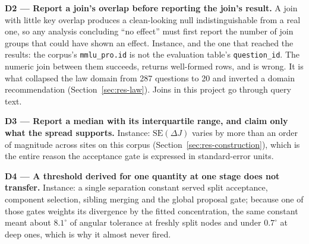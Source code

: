\textbf{D2 --- Report a join's overlap before reporting the join's
result.}
A join with little key overlap produces a clean-looking null
indistinguishable from a real one, so any analysis concluding ``no
effect'' must first report the number of join groups that could have
shown an effect.
Instance, and the one that reached the results: the corpus's
\texttt{mmlu\_pro.id} is not the evaluation table's
\texttt{question\_id}. The numeric join between them succeeds, returns
well-formed rows, and is wrong. It is what collapsed the law domain
from 287 questions to 20 and inverted a domain recommendation
(Section~\ref{sec:res-law}). Joins in this project go through query
text.

\textbf{D3 --- Report a median with its interquartile range, and claim
only what the spread supports.}
Instance: $\mathrm{SE}(\Delta J)$ varies by more than an order of
magnitude across sites on this corpus
(Section~\ref{sec:res-construction}), which is the entire reason the
acceptance gate is expressed in standard-error units.

\textbf{D4 --- A threshold derived for one quantity at one stage does
not transfer.}
Instance: a single separation constant served split acceptance,
component selection, sibling merging and the global proposal gate;
because one of those gates weights its divergence by the fitted
concentration, the same constant meant about $8.1^{\circ}$ of angular
tolerance at freshly split nodes and under $0.7^{\circ}$ at deep
ones, which is why it almost never fired.


